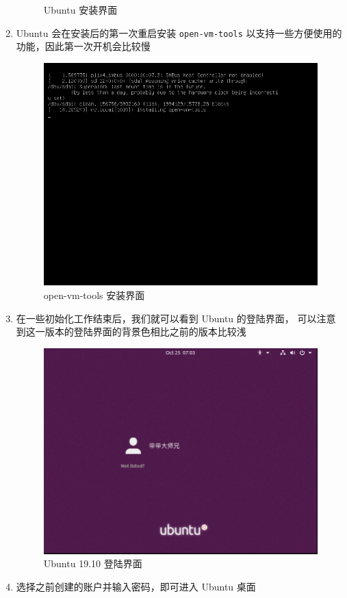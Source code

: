 \documentclass[blue,normal,cn]{elegantnote}
\newcommand{\code}[1]{\colorbox{light-gray}{\texttt{#1}}}
\begin{document}
\begin{enumerate}
\begin{figure}[!htbp]
    \caption{Ubuntu 安装界面}
    \label{fig:UbuntuInstall}
  \end{figure}
  \item Ubuntu 会在安装后的第一次重启安装 \code{open-vm-tools} 
  以支持一些方便使用的功能，因此第一次开机会比较慢
  \begin{figure}[!htbp]
    \centering
    \includegraphics[width=.8\textwidth]{fig/lab-1/fig2-3}
    \caption{open-vm-tools 安装界面}
    \label{fig:open-vm-tools}
  \end{figure}
  \item 在一些初始化工作结束后，我们就可以看到 Ubuntu 的登陆界面，
  可以注意到这一版本的登陆界面的背景色相比之前的版本比较浅
  \begin{figure}[!htbp]
    \centering
    \includegraphics[width=.8\textwidth]{fig/lab-1/fig2-4}
    \caption{Ubuntu 19.10 登陆界面}
    \label{fig:UbuntuLogin}
  \end{figure}
  \item 选择之前创建的账户并输入密码，即可进入 Ubuntu 桌面

\end{enumerate}
\end{document}
